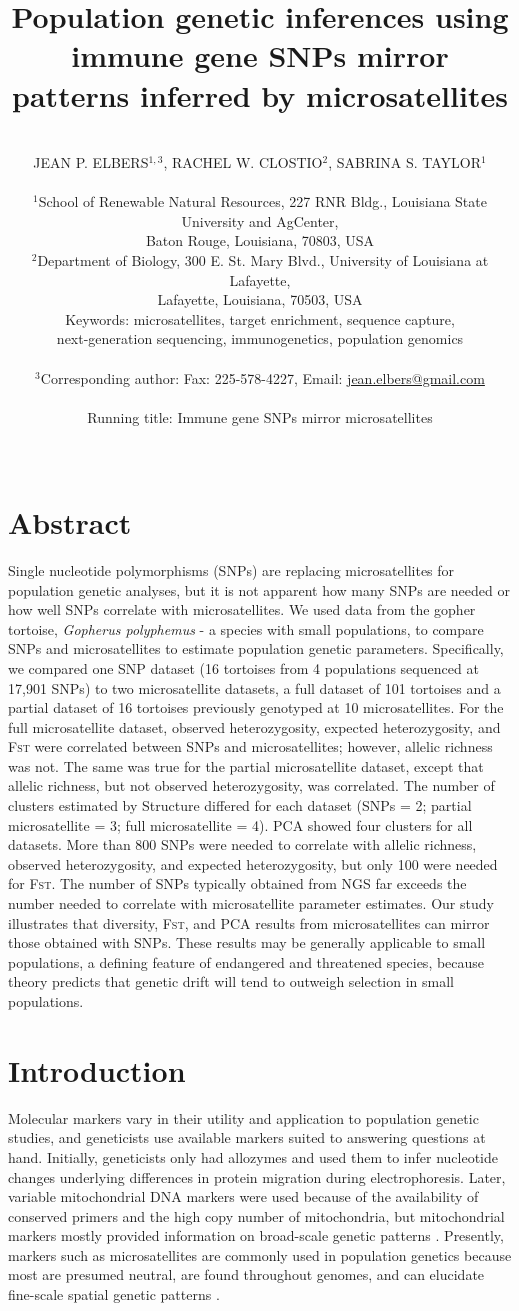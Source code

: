 \documentclass[english]{article}\usepackage[]{graphicx}\usepackage[]{color}
\title{Population genetic inferences using immune gene SNPs mirror patterns inferred by microsatellites}
\date{}
\author{\\
JEAN P. ELBERS$^{1,3}$, RACHEL W. CLOSTIO$^{2}$, SABRINA S. TAYLOR$^{1}$\\\\
$^{1}$School of Renewable Natural Resources, 227 RNR Bldg., Louisiana State University and AgCenter, \\ Baton Rouge, Louisiana, 70803, USA\\
$^{2}$Department of Biology, 300 E. St. Mary Blvd., University of Louisiana at Lafayette, \\ Lafayette, Louisiana, 70503, USA\\
Keywords: microsatellites, target enrichment, sequence capture, \\ next-generation sequencing, immunogenetics, population genomics \\\\
$^{3}$Corresponding author: Fax: 225-578-4227, Email: \underline{jean.elbers@gmail.com}\\\\
Running title: Immune gene SNPs mirror microsatellites\\\\
}
\begin{document}
\maketitle
\pagebreak{}

\section*{Abstract}
Single nucleotide polymorphisms (SNPs) are replacing microsatellites for population genetic analyses, but it is not apparent how many SNPs are needed or how well SNPs correlate with microsatellites. We used data from the gopher tortoise, \textit{Gopherus polyphemus} - a species with small populations, to compare SNPs and microsatellites to estimate population genetic parameters. Specifically, we compared one SNP dataset (16 tortoises from 4 populations sequenced at 17,901 SNPs) to two microsatellite datasets, a full dataset of 101 tortoises and a partial dataset of 16 tortoises previously genotyped at 10 microsatellites. For the full microsatellite dataset, observed heterozygosity, expected heterozygosity, and \textsc{Fst} were correlated between SNPs and microsatellites; however, allelic richness was not. The same was true for the partial microsatellite dataset, except that allelic richness, but not observed heterozygosity, was correlated. The number of clusters estimated by Structure differed for each dataset (SNPs = 2; partial microsatellite = 3; full microsatellite = 4). PCA showed four clusters for all datasets. More than 800 SNPs were needed to correlate with allelic richness, observed heterozygosity, and expected heterozygosity, but only 100 were needed for \textsc{Fst}. The number of SNPs typically obtained from NGS far exceeds the number needed to correlate with microsatellite parameter estimates. Our study illustrates that diversity, \textsc{Fst}, and PCA results from microsatellites can mirror those obtained with SNPs. These results may be generally applicable to small populations, a defining feature of endangered and threatened species, because theory predicts that genetic drift will tend to outweigh selection in small populations.

\section*{Introduction}
Molecular markers vary in their utility and application to population genetic studies, and geneticists use available markers suited to answering questions at hand. Initially, geneticists only had allozymes and used them to infer nucleotide changes underlying differences in protein migration during electrophoresis. Later, variable mitochondrial DNA markers were used because of the availability of conserved primers and the high copy number of mitochondria, but mitochondrial markers mostly provided information on broad-scale genetic patterns \citep{Moritz_1994}. Presently, markers such as microsatellites are commonly used in population genetics because most are presumed neutral, are found throughout genomes, and can elucidate fine-scale spatial genetic patterns \citep[e.g.,][]{Clostio_et_al_2012}.
\end{document}
